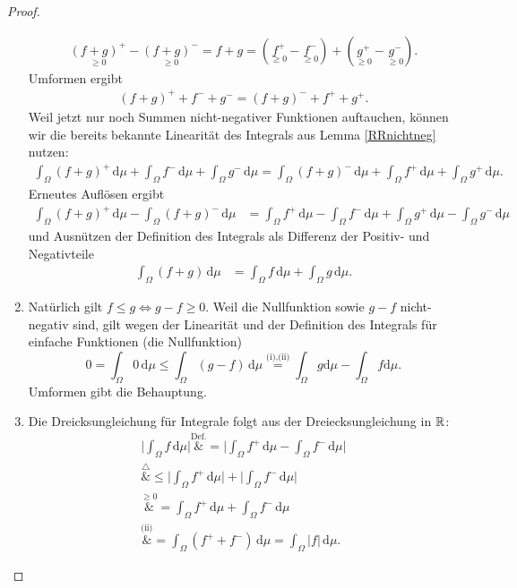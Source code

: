 \begin{proof}
\begin{enumerate}[label=(\roman*)]
		\begin{align*}
			\underset{\geq 0}{(f+g)^+} - \underset{\geq 0}{(f+g)^-} = f + g = (\underset{\geq 0}{f^+} - \underset{\geq 0}{f^-}) + (\underset{\geq 0}{g^+} - \underset{\geq 0}{g^-}).
		\end{align*}
		Umformen ergibt
		\begin{align*}
			 (f + g)^+ + f^- + g^- = (f + g)^- + f^+ + g^+.
		\end{align*}
		Weil jetzt nur noch Summen nicht-negativer Funktionen auftauchen, k\"onnen wir die bereits bekannte Linearit\"at des Integrals aus Lemma \ref{RRnichtneg} nutzen:
		\begin{align*}
			 \int_{\Omega} (f + g)^+\, \mathrm{d}\mu + \int_{\Omega} f^-\, \mathrm{d}\mu + \int_{\Omega} g^- \,\mathrm{d}\mu = \int_{\Omega} (f + g)^- \,\mathrm{d}\mu + \int_{\Omega} f^+ \,\mathrm{d}\mu + \int_{\Omega} g^+ \,\mathrm{d}\mu.
		\end{align*}
		Erneutes Auflösen ergibt 
		\begin{align*}
			\int_{\Omega} (f + g)^+ \,\mathrm{d}\mu - \int_{\Omega} (f + g)^- \,\mathrm{d}\mu &= \int_{\Omega} f^+ \,\mathrm{d}\mu - \int_{\Omega} f^- \,\mathrm{d}\mu + \int_{\Omega} g^+ \,\mathrm{d}\mu - \int_{\Omega} g^-\, \mathrm{d}\mu
		\end{align*}
		und Ausn\"utzen der Definition des Integrals als Differenz der Positiv- und Negativteile
		\begin{align*}	
			 \int_{\Omega} (f + g)\, \mathrm{d}\mu &= \int_{\Omega} f\, \mathrm{d}\mu + \int_{\Omega} g\, \mathrm{d}\mu.
		\end{align*}
		\item Nat\"urlich gilt $f \leq g \Leftrightarrow g - f \geq 0$. Weil die Nullfunktion sowie $g-f$ nicht-negativ sind, gilt wegen der Linearit\"at und der Definition des Integrals f\"ur einfache Funktionen (die Nullfunktion)
		\[ 0 = \int_{\Omega} 0 \,\mathrm{d}\mu \leq \int_{\Omega} (g-f)\, \mathrm{d}\mu \overset{\text{(i),(ii)}}{=} \int_{\Omega} g \mathrm{d}\mu - \int_{\Omega} f \mathrm{d}\mu. \]
		Umformen gibt die Behauptung.
		\item Die Dreicksungleichung f\"ur Integrale folgt aus der Dreiecksungleichung in $\mathbb{R}$:
		\begin{align*}
			\Big|\int_{\Omega} f\, \mathrm{d}\mu\Big| \overset{\text{Def.}}&{=} \Big|\int_{\Omega} f^+ \,\mathrm{d}\mu - \int_{\Omega} f^- \,\mathrm{d}\mu\Big| \\
			\overset{\triangle}&{\leq} \Big|\int_{\Omega} f^+ \,\mathrm{d}\mu\Big| + \Big|\int_{\Omega} f^- \,\mathrm{d}\mu\Big|\\
			\overset{\geq 0}&{=} \int_{\Omega} f^+\, \mathrm{d}\mu + \int_{\Omega} f^- \,\mathrm{d}\mu\\
		 \overset{\text{(ii)}}&{=} \int_{\Omega} (f^+ + f^- )\,\mathrm{d}\mu = \int_{\Omega} |f| \,\mathrm{d}\mu.
		\end{align*}
	\end{enumerate}
\end{proof}

